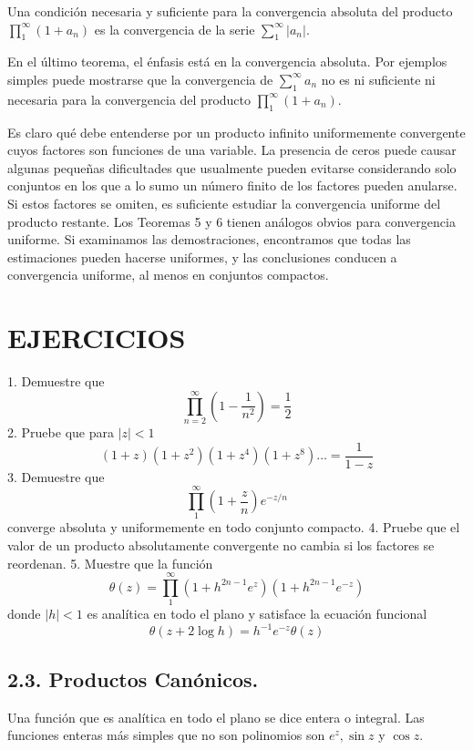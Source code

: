 \documentclass{article}
\theoremstyle{nonumberplain}
\begin{document}
\begin{theorem}[6]
Una condición necesaria y suficiente para la convergencia absoluta del producto \( \prod_{1}^{\infty}\left(1+a_{n}\right) \) es la convergencia de la serie \( \sum_{1}^{\infty}\left|a_{n}\right| \).
\end{theorem}

En el último teorema, el énfasis está en la convergencia absoluta. Por ejemplos simples puede mostrarse que la convergencia de \( \sum_{1}^{\infty} a_{n} \) no es ni suficiente ni necesaria para la convergencia del producto \( \prod_{1}^{\infty}\left(1+a_{n}\right) \).

Es claro qué debe entenderse por un producto infinito uniformemente convergente cuyos factores son funciones de una variable. La presencia de ceros puede causar algunas pequeñas dificultades que usualmente pueden evitarse considerando solo conjuntos en los que a lo sumo un número finito de los factores pueden anularse. Si estos factores se omiten, es suficiente estudiar la convergencia uniforme del producto restante. Los Teoremas 5 y 6 tienen análogos obvios para convergencia uniforme. Si examinamos las demostraciones, encontramos que todas las estimaciones pueden hacerse uniformes, y las conclusiones conducen a convergencia uniforme, al menos en conjuntos compactos.

\section*{EJERCICIOS}
1. Demuestre que
\[
\prod_{n=2}^{\infty}\left(1-\frac{1}{n^{2}}\right)=\frac{1}{2}
\]
2. Pruebe que para \( |z|<1 \)
\[
(1+z)\left(1+z^{2}\right)\left(1+z^{4}\right)\left(1+z^{8}\right) \ldots=\frac{1}{1-z}
\]
3. Demuestre que
\[
\prod_{1}^{\infty}\left(1+\frac{z}{n}\right) e^{-z / n}
\]
converge absoluta y uniformemente en todo conjunto compacto.
4. Pruebe que el valor de un producto absolutamente convergente no cambia si los factores se reordenan.
5. Muestre que la función
\[
\theta(z)=\prod_{1}^{\infty}\left(1+h^{2 n-1} e^{z}\right)\left(1+h^{2 n-1} e^{-z}\right)
\]
donde \( |h|<1 \) es analítica en todo el plano y satisface la ecuación funcional
\[
\theta(z+2 \log h)=h^{-1} e^{-z} \theta(z)
\]

\subsection*{2.3. Productos Canónicos.} Una función que es analítica en todo el plano se dice entera o integral. Las funciones enteras más simples que no son polinomios son \( e^{z}, \sin z \) y \( \cos z \).
\end{document}

